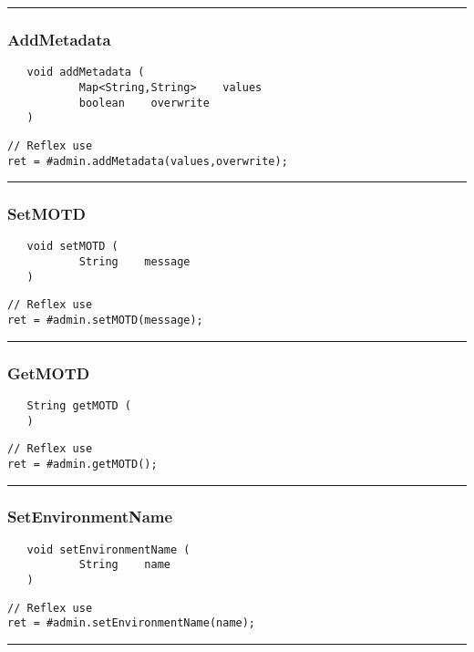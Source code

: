 \rule{15cm}{2pt}
\subsubsection{AddMetadata}
\label{Api:AddMetadata}
\begin{verbatim}
   void addMetadata (
           Map<String,String>    values
           boolean    overwrite
   )
\end{verbatim}
\begin{lstlisting}[language=reflex]
// Reflex use
ret = #admin.addMetadata(values,overwrite);
\end{lstlisting}



\rule{15cm}{2pt}
\subsubsection{SetMOTD}
\label{Api:SetMOTD}
\begin{verbatim}
   void setMOTD (
           String    message
   )
\end{verbatim}
\begin{lstlisting}[language=reflex]
// Reflex use
ret = #admin.setMOTD(message);
\end{lstlisting}



\rule{15cm}{2pt}
\subsubsection{GetMOTD}
\label{Api:GetMOTD}
\begin{verbatim}
   String getMOTD (
   )
\end{verbatim}
\begin{lstlisting}[language=reflex]
// Reflex use
ret = #admin.getMOTD();
\end{lstlisting}



\rule{15cm}{2pt}
\subsubsection{SetEnvironmentName}
\label{Api:SetEnvironmentName}
\begin{verbatim}
   void setEnvironmentName (
           String    name
   )
\end{verbatim}
\begin{lstlisting}[language=reflex]
// Reflex use
ret = #admin.setEnvironmentName(name);
\end{lstlisting}



\rule{15cm}{2pt}
